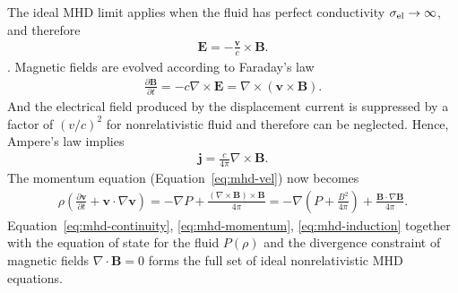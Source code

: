 The ideal MHD limit applies when the fluid has perfect conductivity $\sigma_{\rm el}\rightarrow\infty$, and therefore 
\begin{eqnarray}\label{eq:mhd-vanshing-e}
	\boldsymbol{E}=-\frac{\boldsymbol{v}}{c}\times\boldsymbol{B}.
\end{eqnarray}.
Magnetic fields are evolved according to Faraday's law
\begin{eqnarray}\label{eq:mhd-induction}
	\frac{\partial \boldsymbol{B}}{\partial t} = -c\nabla\times\boldsymbol{E} = \nabla\times(\boldsymbol{v}\times\boldsymbol{B}).
\end{eqnarray}
And the electrical field produced by the displacement current  is suppressed by a factor of $(v/c)^2$ for nonrelativistic fluid and therefore can be neglected.
Hence, Ampere's law implies
\begin{eqnarray}
	\boldsymbol{j}=\frac{c}{4\pi}\nabla\times \boldsymbol{B}.
\end{eqnarray}
The momentum equation (Equation~\ref{eq:mhd-vel}) now becomes
\begin{eqnarray}\label{eq:mhd-momentum}
	\rho \left(\frac{\partial \boldsymbol{v}}{\partial t} + \boldsymbol{v}\cdot \nabla \boldsymbol{v}\right) = -\nabla P + \frac{(\nabla\times \boldsymbol{B})\times\boldsymbol{B}}{4\pi} = -\nabla\left( P + \frac{B^2}{4\pi} \right) + \frac{\boldsymbol{B}\cdot\nabla\boldsymbol{B}}{4\pi}.
\end{eqnarray}
Equation~\ref{eq:mhd-continuity}, \ref{eq:mhd-momentum}, \ref{eq:mhd-induction} together with the equation of state for the fluid $P(\rho)$ and the divergence constraint of magnetic fields $\nabla\cdot\boldsymbol{B}=0$ forms the full set of ideal nonrelativistic MHD equations.


